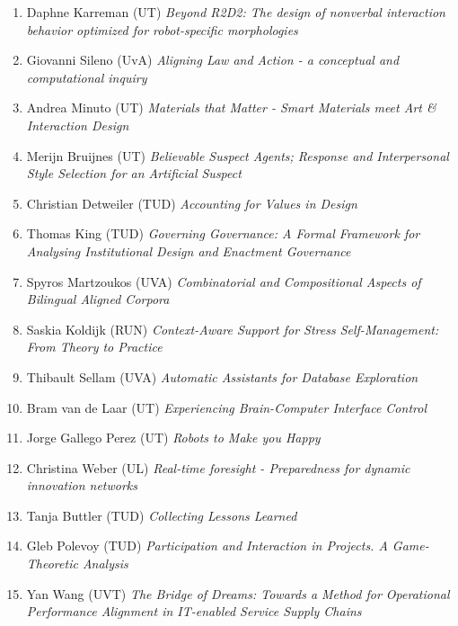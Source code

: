 \begin{multicols}{2}
\begin{scriptsize}
\begin{enumerate}[leftmargin=*,noitemsep,topsep=0pt,parsep=1pt,partopsep=0pt]
{}\item Daphne Karreman (UT) \textit{Beyond R2D2: The design of nonverbal interaction behavior optimized for robot-specific morphologies
}\item Giovanni Sileno (UvA) \textit{Aligning Law and Action - a conceptual and computational inquiry 
}\item Andrea Minuto (UT) \textit{Materials that Matter - Smart Materials meet Art \& Interaction Design
}\item Merijn Bruijnes (UT) \textit{Believable Suspect Agents; Response and Interpersonal Style Selection for an Artificial Suspect
}\item Christian Detweiler (TUD) \textit{Accounting for Values in Design
}\item Thomas King (TUD) \textit{Governing Governance: A Formal Framework for Analysing Institutional Design and Enactment Governance
}\item Spyros Martzoukos (UVA) \textit{Combinatorial and Compositional Aspects of Bilingual Aligned Corpora 
}\item Saskia Koldijk (RUN) \textit{Context-Aware Support for Stress Self-Management: From Theory to Practice
}\item Thibault Sellam (UVA) \textit{Automatic Assistants for Database Exploration
}\item Bram van de Laar (UT) \textit{Experiencing Brain-Computer Interface Control
}\item Jorge Gallego Perez (UT) \textit{Robots to Make you Happy
}\item Christina Weber (UL) \textit{Real-time foresight - Preparedness for dynamic innovation networks
}\item Tanja Buttler (TUD) \textit{Collecting Lessons Learned
}\item Gleb Polevoy (TUD) \textit{Participation and Interaction in Projects. A Game-Theoretic Analysis
}\item Yan Wang (UVT) \textit{The Bridge of Dreams: Towards a Method for Operational Performance Alignment in IT-enabled Service Supply Chains}
\end{enumerate}


\end{scriptsize}
\end{multicols}
